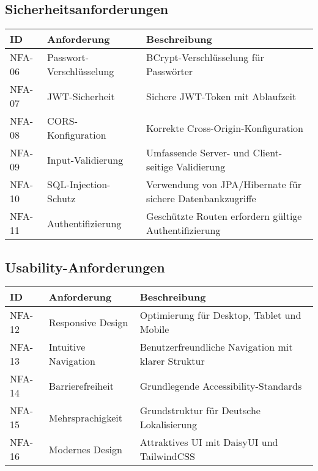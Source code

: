 \documentclass[a4paper,12pt]{article}
\begin{document}
\subsection{Sicherheitsanforderungen}
\begin{longtable}{|p{}|p{}|p{}|}
\hline
\textbf{ID} & \textbf{Anforderung} & \textbf{Beschreibung} \\
\hline
NFA-06 & Passwort-Verschlüsselung & BCrypt-Verschlüsselung für Passwörter \\
\hline
NFA-07 & JWT-Sicherheit & Sichere JWT-Token mit Ablaufzeit \\
\hline
NFA-08 & CORS-Konfiguration & Korrekte Cross-Origin-Konfiguration \\
\hline
NFA-09 & Input-Validierung & Umfassende Server- und Client-seitige Validierung \\
\hline
NFA-10 & SQL-Injection-Schutz & Verwendung von JPA/Hibernate für sichere Datenbankzugriffe \\
\hline
NFA-11 & Authentifizierung & Geschützte Routen erfordern gültige Authentifizierung \\
\hline
\end{longtable}

\subsection{Usability-Anforderungen}
\begin{longtable}{|p{}|p{}|p{}|}
\hline
\textbf{ID} & \textbf{Anforderung} & \textbf{Beschreibung} \\
\hline
NFA-12 & Responsive Design & Optimierung für Desktop, Tablet und Mobile \\
\hline
NFA-13 & Intuitive Navigation & Benutzerfreundliche Navigation mit klarer Struktur \\
\hline
NFA-14 & Barrierefreiheit & Grundlegende Accessibility-Standards \\
\hline
NFA-15 & Mehrsprachigkeit & Grundstruktur für Deutsche Lokalisierung \\
\hline
NFA-16 & Modernes Design & Attraktives UI mit DaisyUI und TailwindCSS \\
\hline
\end{longtable}
\end{document}
